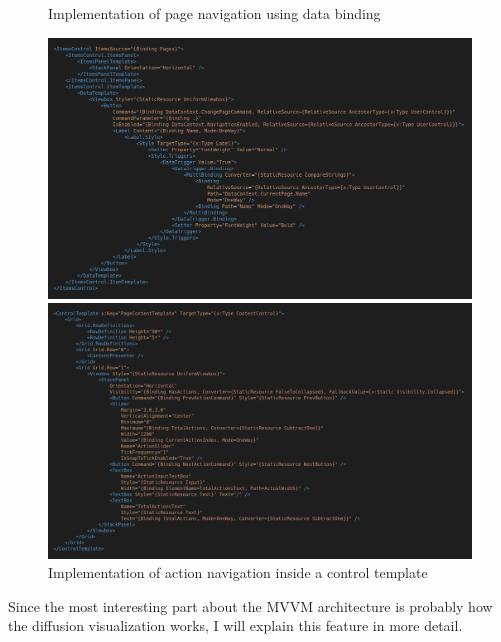 \begin{figure}
\caption{Implementation of page navigation using data binding}
\label{fig:mvvm.pagenavigation}
\centering
\includegraphics[width=\textwidth]{figures/code/mvvm-arch/page-navigation-template.png}
\caption{Implementation of action navigation inside a control template}
\label{fig:mvvm.actionnavigation}
\includegraphics[width=\textwidth]{figures/code/mvvm-arch/action-navigation-template.png}
\end{figure}

Since the most interesting part about the MVVM architecture is probably how the diffusion visualization works, I will explain this feature in more detail.

